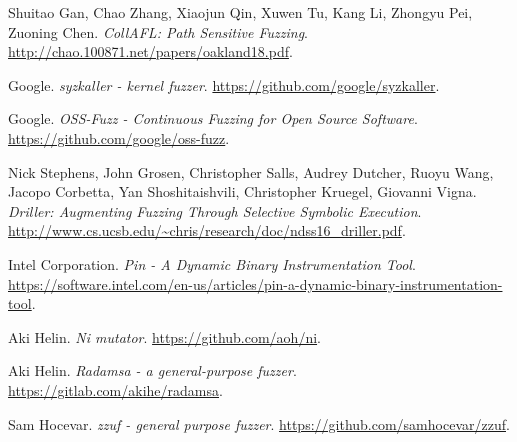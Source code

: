 \begin{thebibliography}{99}
  Shuitao Gan, Chao Zhang, Xiaojun Qin, Xuwen Tu, Kang Li, Zhongyu Pei, Zuoning Chen.
  \textit{CollAFL: Path Sensitive Fuzzing}.
  \url{http://chao.100871.net/papers/oakland18.pdf}.

  Google.
  \textit{syzkaller - kernel fuzzer}.
  \url{https://github.com/google/syzkaller}.

  Google.
  \textit{OSS-Fuzz - Continuous Fuzzing for Open Source Software}.
  \url{https://github.com/google/oss-fuzz}.

  Nick Stephens, John Grosen, Christopher Salls, Audrey Dutcher, Ruoyu Wang,
  Jacopo Corbetta, Yan Shoshitaishvili, Christopher Kruegel, Giovanni Vigna.
  \textit{Driller: Augmenting Fuzzing Through Selective Symbolic Execution}.
  \url{http://www.cs.ucsb.edu/~chris/research/doc/ndss16_driller.pdf}.

  Intel Corporation.
  \textit{Pin - A Dynamic Binary Instrumentation Tool}.
  \url{https://software.intel.com/en-us/articles/pin-a-dynamic-binary-instrumentation-tool}.

  Aki Helin.
  \textit{Ni mutator}.
  \url{https://github.com/aoh/ni}.

  Aki Helin.
  \textit{Radamsa - a general-purpose fuzzer}.
  \url{https://gitlab.com/akihe/radamsa}.

  Sam Hocevar.
  \textit{zzuf - general purpose fuzzer}.
  \url{https://github.com/samhocevar/zzuf}.


\end{thebibliography}
